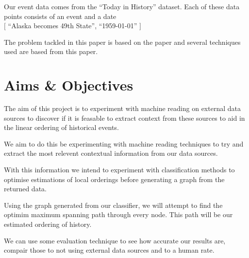 \documentclass[bsc,frontabs,twoside,singlespacing,parskip,deptreport]{infthesis}     %
\begin{document}
Our event data comes from the ``Today in History'' dataset. Each of these data points consists
of an event and a date\\
$[$ ``Alaska becomes 49th State'', ``1959-01-01'' $]$


The problem tackled in this paper is based on the paper \cite{abend2015lexical} and several
techniques used are based from this paper. 




\section{Aims \& Objectives}

The aim of this project is to experiment with machine reading on external data sources to
discover if it is feasable to extract context from these sources to aid in the linear ordering
of historical events.

We aim to do this be experimenting with machine reading techniques to try and extract the most
relevent contextual information from our data sources.

With this information we intend to experiment with classification methods to optimise estimations
of local orderings before generating a graph from the returned data.

Using the graph generated from our classifier, we will attempt to find the optimim maximum spanning path
through every node. This path will be our estimated ordering of history.

We can use some evaluation technique to see how accurate our results are, compair those to not using
external data sources and to a human rate.
\end{document}
